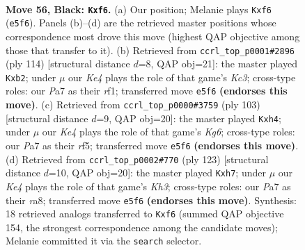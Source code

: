 \documentclass[11pt]{article}
\begin{document}
\clearpage

\begin{figure}[p]\centering
\begin{subfigure}{0.46\textwidth}\centering
\resizebox{\linewidth}{!}{%
\newchessgame
\chessboard[
  setfen={8/p2p4/2p2P2/4k3/2r5/6K1/8/8 b - - 0 56},
  showmover=false,
  pgfstyle=straightmove, color=movearrow, markmove={e5-f6}
]}
\caption{}
\end{subfigure}\hfill
\begin{subfigure}{0.46\textwidth}\centering
\resizebox{\linewidth}{!}{%
\newchessgame
\chessboard[
  setfen={8/6k1/8/6p1/4P3/2K2P1R/1p6/5r2 w - - 2 58},
  showmover=false,
  pgfstyle=straightmove, color=movearrow, markmove={c3-b2}
]}
\caption{}
\end{subfigure}
\\[4pt]
\begin{subfigure}{0.46\textwidth}\centering
\resizebox{\linewidth}{!}{%
\newchessgame
\chessboard[
  setfen={8/8/8/5R2/7P/p5k1/2K5/r7 b - - 0 52},
  showmover=false,
  pgfstyle=straightmove, color=movearrow, markmove={g3-h4}
]}
\caption{}
\end{subfigure}\hfill
\begin{subfigure}{0.46\textwidth}\centering
\resizebox{\linewidth}{!}{%
\newchessgame
\chessboard[
  setfen={R7/7P/5rpk/8/8/6K1/8/8 b - - 6 62},
  showmover=false,
  pgfstyle=straightmove, color=movearrow, markmove={h6-h7}
]}
\caption{}
\end{subfigure}
\caption{\textbf{Move 56, Black: \texttt{Kxf6}.} (a) Our position; Melanie plays \texttt{Kxf6} (\texttt{e5f6}). Panels (b)--(d) are the retrieved master positions whose correspondence most drove this move (highest QAP objective among those that transfer to it). (b) Retrieved from \texttt{ccrl\_top\_p0001\#2896} (ply 114) [structural distance $d$=8, QAP obj=21]: the master played \texttt{Kxb2}; under $\mu$ our \emph{Ke4} plays the role of that game's \emph{Kc3}; cross-type roles: our \emph{P}a7 as their \emph{r}f1; transferred move \texttt{e5f6} \textbf{(endorses this move)}. (c) Retrieved from \texttt{ccrl\_top\_p0000\#3759} (ply 103) [structural distance $d$=9, QAP obj=20]: the master played \texttt{Kxh4}; under $\mu$ our \emph{Ke4} plays the role of that game's \emph{Kg6}; cross-type roles: our \emph{P}a7 as their \emph{r}f5; transferred move \texttt{e5f6} \textbf{(endorses this move)}. (d) Retrieved from \texttt{ccrl\_top\_p0002\#770} (ply 123) [structural distance $d$=10, QAP obj=20]: the master played \texttt{Kxh7}; under $\mu$ our \emph{Ke4} plays the role of that game's \emph{Kh3}; cross-type roles: our \emph{P}a7 as their \emph{r}a8; transferred move \texttt{e5f6} \textbf{(endorses this move)}. Synthesis: 18 retrieved analogs transferred to \texttt{Kxf6} (summed QAP objective 154, the strongest correspondence among the candidate moves); Melanie committed it via the \texttt{search} selector.}
\label{fig:thought-m111}
\end{figure}
\end{document}
